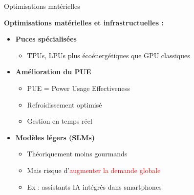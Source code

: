 \begin{frame}{Optimisations matérielles}

\textbf{Optimisations matérielles et infrastructuelles :}

\vspace{0.3cm}

\begin{itemize}
    \item<+-> \textbf{Puces spécialisées}
        \begin{itemize}
            \item TPUs, LPUs plus écoénergétiques que GPU classiques
        \end{itemize}

    \vspace{0.2cm}
    \item<+-> \textbf{Amélioration du PUE}
        \begin{itemize}
            \item PUE = Power Usage Effectiveness
            \item Refroidissement optimisé
            \item Gestion en temps réel
        \end{itemize}

    \vspace{0.2cm}
    \item<+-> \textbf{Modèles légers (SLMs)}
        \begin{itemize}
            \item Théoriquement moins gourmands
            \item Mais risque d'\textcolor{red}{augmenter la demande globale}
            \item Ex : assistants IA intégrés dans smartphones
        \end{itemize}
\end{itemize}

\end{frame}


